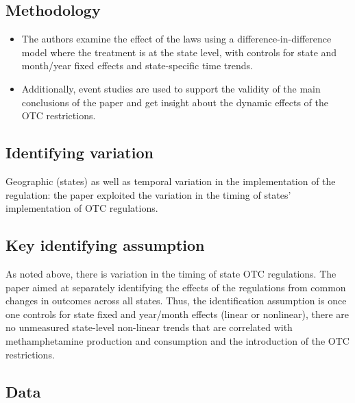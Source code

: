 \documentclass[
  11pt,
]{article}
\providecommand{\tightlist}{%
  \setlength{\itemsep}{0pt}\setlength{\parskip}{0pt}}
\begin{document}
\hypertarget{methodology}{%
\subsection*{Methodology}\label{methodology}}

\begin{itemize}
\tightlist
\item
  The authors examine the effect of the laws using a
  difference-in-difference model where the treatment is at the state
  level, with controls for state and month/year fixed effects and
  state-specific time trends.
\item
  Additionally, event studies are used to support the validity of the
  main conclusions of the paper and get insight about the dynamic
  effects of the OTC restrictions.
\end{itemize}

\hypertarget{identifying-variation}{%
\subsection*{Identifying variation}\label{identifying-variation}}

Geographic (states) as well as temporal variation in the implementation
of the regulation: the paper exploited the variation in the timing of
states' implementation of OTC regulations.

\hypertarget{key-identifying-assumption}{%
\subsection*{Key identifying
assumption}\label{key-identifying-assumption}}

As noted above, there is variation in the timing of state OTC
regulations. The paper aimed at separately identifying the effects of
the regulations from common changes in outcomes across all states. Thus,
the identification assumption is once one controls for state fixed and
year/month effects (linear or nonlinear), there are no unmeasured
state-level non-linear trends that are correlated with methamphetamine
production and consumption and the introduction of the OTC restrictions.

\hypertarget{data}{%
\subsection*{Data}\label{data}}
\end{document}
